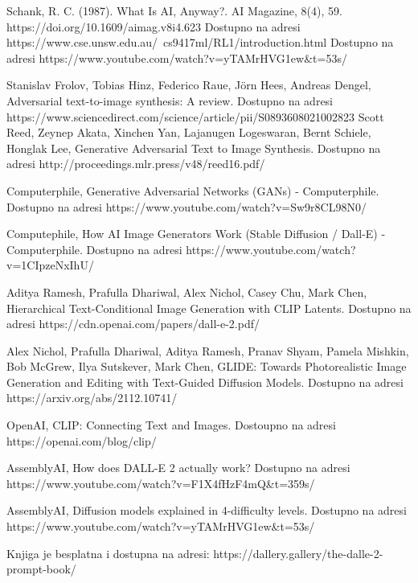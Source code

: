 \documentclass[12pt, letterpaper]{article}
\begin{document}
\pagebreak
\begin{thebibliography}{10}

 Schank, R. C. (1987). What Is AI, Anyway?. AI Magazine, 8(4), 59. https://doi.org/10.1609/aimag.v8i4.623  
 Dostupno na adresi https://www.cse.unsw.edu.au/~cs9417ml/RL1/introduction.html 
 Dostupno na adresi https://www.youtube.com/watch?v=yTAMrHVG1ew\&t=53s/

 Stanislav Frolov, Tobias Hinz, Federico Raue, Jörn Hees, Andreas Dengel, Adversarial text-to-image synthesis: A review. Dostupno na adresi https://www.sciencedirect.com/science/article/pii/S0893608021002823
 Scott Reed, Zeynep Akata, Xinchen Yan, Lajanugen Logeswaran, Bernt Schiele, Honglak Lee, Generative Adversarial Text to Image Synthesis. Dostupno na adresi http://proceedings.mlr.press/v48/reed16.pdf/

 Computerphile, Generative Adversarial Networks (GANs) - Computerphile. Dostupno na adresi https://www.youtube.com/watch?v=Sw9r8CL98N0/

 Computephile, How AI Image Generators Work (Stable Diffusion / Dall-E) - Computerphile. Dostupno na adresi https://www.youtube.com/watch?v=1CIpzeNxIhU/

 Aditya Ramesh, Prafulla Dhariwal, Alex Nichol, Casey Chu, Mark Chen, Hierarchical Text-Conditional
Image Generation with CLIP Latents. Dostupno na adresi https://cdn.openai.com/papers/dall-e-2.pdf/

 Alex Nichol, Prafulla Dhariwal, Aditya Ramesh, Pranav Shyam, Pamela Mishkin, Bob McGrew, Ilya Sutskever, Mark Chen, GLIDE: Towards Photorealistic Image Generation and Editing with Text-Guided Diffusion Models. Dostupno na adresi https://arxiv.org/abs/2112.10741/

 OpenAI, CLIP: Connecting
Text and Images. Dostoupno na adresi https://openai.com/blog/clip/

 AssemblyAI, How does DALL-E 2 actually work? Dostupno na adresi https://www.youtube.com/watch?v=F1X4fHzF4mQ\&t=359s/

 AssemblyAI, Diffusion models explained in 4-difficulty levels. Dostupno na adresi https://www.youtube.com/watch?v=yTAMrHVG1ew\&t=53s/

Knjiga je besplatna i dostupna na adresi: https://dallery.gallery/the-dalle-2-prompt-book/


\end{thebibliography}
\end{document}
